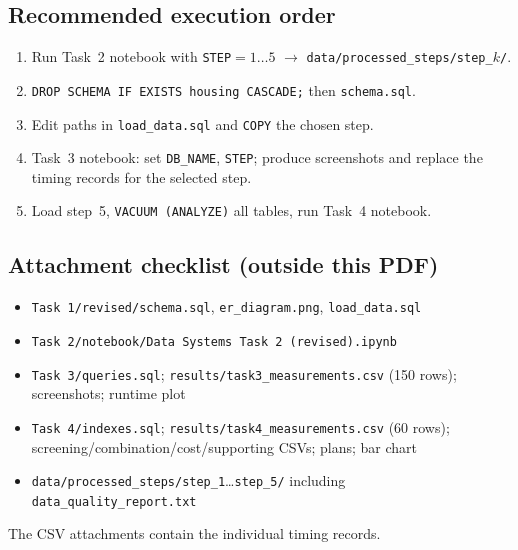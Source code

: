 \subsection{Recommended execution order}
\begin{enumerate}
  \item Run Task~2 notebook with \texttt{STEP}${}=1\ldots5$ $\rightarrow$ \texttt{data/processed\_steps/step\_$k$/}.
  \item \texttt{DROP SCHEMA IF EXISTS housing CASCADE;} then \texttt{schema.sql}.
  \item Edit paths in \texttt{load\_data.sql} and \texttt{COPY} the chosen step.
  \item Task~3 notebook: set \texttt{DB\_NAME}, \texttt{STEP}; produce screenshots and replace the timing records for the selected step.
  \item Load step~5, \texttt{VACUUM (ANALYZE)} all tables, run Task~4 notebook.
\end{enumerate}

\subsection{Attachment checklist (outside this PDF)}
\begin{itemize}
  \item \texttt{Task 1/revised/schema.sql}, \texttt{er\_diagram.png}, \texttt{load\_data.sql}
  \item \texttt{Task 2/notebook/Data Systems Task 2 (revised).ipynb}
  \item \texttt{Task 3/queries.sql}; \texttt{results/task3\_measurements.csv} (150 rows); screenshots; runtime plot
  \item \texttt{Task 4/indexes.sql}; \texttt{results/task4\_measurements.csv} (60 rows); screening/combination/cost/supporting CSVs; plans; bar chart
  \item \texttt{data/processed\_steps/step\_1}\ldots\texttt{step\_5/} including \texttt{data\_quality\_report.txt}
\end{itemize}
The CSV attachments contain the individual timing records.
